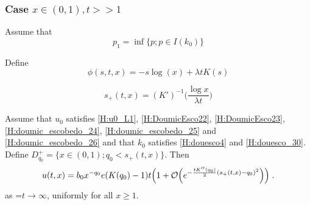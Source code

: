 \documentclass[11pt]{amsart}
\begin{document}
\subsubsection{Case $x \in (0, 1), t >> 1$}

Assume that 
    \begin{equation}
        p_1 = \inf \{ p; p \in I(k_0) \}
        \label{H:douesco_30}
    \end{equation}

Define $$\phi(s,t,x) = - s \log(x) +  \lambda t K(s) $$

\begin{equation*}
    s_+(t,x) = (K')^{-1} \Big( \frac{\log x}{\lambda t} \Big)
\end{equation*}

\begin{theorem}
Assume that $u_0$ satisfies \eqref{H:u0_L1}, \eqref{H:DoumicEsco22}, \eqref{H:DoumicEsco23}, \eqref{H:doumic_escobedo_24}, \eqref{H:doumic_escobedo_25} and \eqref{H:doumic_escobedo_26} and that $k_0$ satisfies \eqref{H:douesco4} and \eqref{H:douesco_30}. \\
Define $D_{q_0}^+ = \{ x \in (0,1); q_0 < s_+(t,x)\}.$
Then 
    \begin{equation*}
        u(t,x) = b_0 x^{-q_0}e(K(q_0)-1)t \Big( 1 + \mathcal{O} \Big( e^{-\frac{t K''(q_0)}{2}(s_+(t,x) - q_0)^2} \Big) \Big)
        \; .
    \end{equation*}
as =$t \to \infty$, uniformly for all $x \geq 1$.
\end{theorem}
\end{document}
